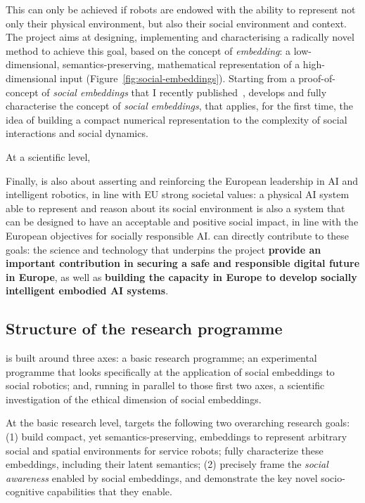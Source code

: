 This can only be achieved if robots are endowed with the ability to represent
not only their physical environment, but also their social environment and
context. The \project project aims at designing, implementing and characterising
a radically novel method to achieve this goal, based on the concept of
\emph{embedding}: a low-dimensional, semantics-preserving, mathematical
representation of a high-dimensional input (Figure~\ref{fig:social-embeddings}).
Starting from a proof-of-concept of \emph{social embeddings} that I recently
published~\cite{lemaignan2024social}, \project develops and fully characterise
the concept of \emph{social embeddings}, that applies, for the first time, the
idea of building a compact numerical representation to the complexity of social
interactions and social dynamics.


At a scientific level, 

Finally, \project is also about asserting and reinforcing the European
leadership in AI and intelligent robotics, in line with EU strong societal
values: a physical AI system able to represent and reason about its social
environment is also a system that can be designed to have an acceptable and
positive social impact, in line with the European objectives for socially
responsible AI. \project can directly contribute to these goals: the science and
technology that underpins the project \textbf{provide an important contribution
in securing a safe and responsible digital future in Europe}, as well as
\textbf{\project building the capacity in Europe to develop socially intelligent
embodied AI systems}. 


\subsection{Structure of the research programme}

\project is built around three axes: a basic research programme; an experimental
programme that looks specifically at the application of social embeddings to
social robotics; and, running in parallel to those first two axes, a scientific
investigation of the ethical dimension of social embeddings.

At the basic research level, \project targets the following
two overarching research goals: (1) build compact, yet semantics-preserving,
embeddings to represent arbitrary social and spatial environments for service
robots; fully characterize these embeddings, including their latent semantics;
(2) precisely frame the \emph{social awareness} enabled by social embeddings,
and demonstrate the key novel socio-cognitive capabilities that they enable.

